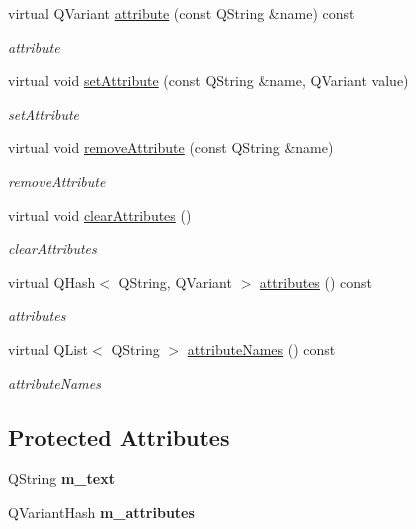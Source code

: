 \begin{DoxyCompactItemize}
virtual Q\+Variant \hyperlink{class_annotation_element_a55f85fb15ed52122653b0769c857899c}{attribute} (const Q\+String \&name) const
\begin{DoxyCompactList}\small\item\em attribute \end{DoxyCompactList}\item 
virtual void \hyperlink{class_annotation_element_a206d8790fe92a7c8e6b703d026836584}{set\+Attribute} (const Q\+String \&name, Q\+Variant value)
\begin{DoxyCompactList}\small\item\em set\+Attribute \end{DoxyCompactList}\item 
virtual void \hyperlink{class_annotation_element_a0acb66aa65f201880286d82dda4d82bf}{remove\+Attribute} (const Q\+String \&name)
\begin{DoxyCompactList}\small\item\em remove\+Attribute \end{DoxyCompactList}\item 
\mbox{\label{class_annotation_element_af81f11a7d19f09e28a73cc3af49fd128}} 
virtual void \hyperlink{class_annotation_element_af81f11a7d19f09e28a73cc3af49fd128}{clear\+Attributes} ()
\begin{DoxyCompactList}\small\item\em clear\+Attributes \end{DoxyCompactList}\item 
virtual Q\+Hash$<$ Q\+String, Q\+Variant $>$ \hyperlink{class_annotation_element_a58082d92f50c4fde2d18ce24ef3fd283}{attributes} () const
\begin{DoxyCompactList}\small\item\em attributes \end{DoxyCompactList}\item 
virtual Q\+List$<$ Q\+String $>$ \hyperlink{class_annotation_element_ab28b90d83a5fdf7d150df32871f43ce8}{attribute\+Names} () const
\begin{DoxyCompactList}\small\item\em attribute\+Names \end{DoxyCompactList}\end{DoxyCompactItemize}
\subsection*{Protected Attributes}
\begin{DoxyCompactItemize}
\item 
\mbox{\label{class_annotation_element_a4b8247dab4ac0617a86efeb83dd81b3d}} 
Q\+String {\bfseries m\+\_\+text}
\item 
\mbox{\label{class_annotation_element_afb3291121c572b7f2a08f7cf866fa553}} 
Q\+Variant\+Hash {\bfseries m\+\_\+attributes}
\end{DoxyCompactItemize}
